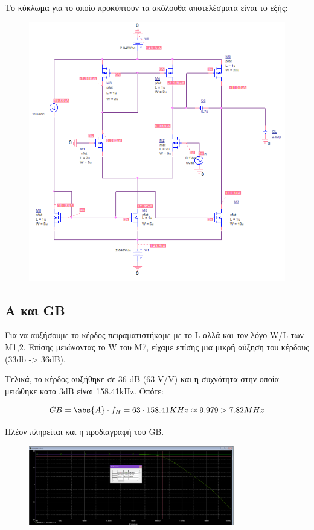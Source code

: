 \documentclass[12pt, a4paper]{article}
\begin{document}
Το κύκλωμα για το οποίο προκύπτουν τα ακόλουθα αποτελέσματα είναι το εξής:

\begin{figure}[h!]
	\centering
	\includegraphics[width = \textwidth, height = .4\textheight, keepaspectratio]{assets/circuit_tuned.png}
\end{figure}


\subsection{Α και GB}

Για να αυξήσουμε το κέρδος πειραματιστήκαμε με το L αλλά και τον λόγο W/L των M1,2. Επίσης μειώνοντας το W του M7, είχαμε επίσης μια μικρή αύξηση του κέρδους (33db -> 36dB).

Τελικά, το κέρδος αυξήθηκε σε 36 dB (63 V/V) και η συχνότητα στην οποία μειώθηκε κατα 3dB είναι 158.41kHz. Οπότε: 

\[  GB = \abs{A} \cdot f_H = 63 \cdot 158.41KHz \approx 9.979 > 7.82 MHz \]

Πλέον πληρείται και η προδιαγραφή του GB.

\begin{figure}[h!]
	\centering
	\includegraphics[width = 0.8\textwidth, height = .3\textheight, keepaspectratio]{assets/gain_GB_tuned.png}
\end{figure}
\end{document}

